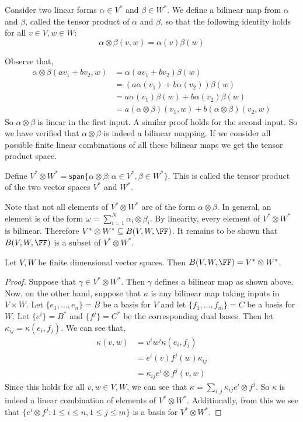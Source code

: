 \begin{defn}
Consider two linear forms $\alpha \in V^*$ and $\beta \in W^*$. We define a bilinear map from $\alpha$ and $\beta$, called the tensor product of $\alpha$ and $\beta$, so that the following identity holds for all $v\in V, w\in W$:
\[\alpha\otimes \beta (v,w) = \alpha(v)\beta(w)\]
\end{defn}
Observe that,
\begin{align*}\alpha\otimes\beta(av_1+bv_2,w) &= \alpha(av_1+bv_2)\beta(w) \\&= (a\alpha(v_1)+b\alpha(v_2))\beta(w)\\& = a\alpha(v_1)\beta(w)+b\alpha(v_2)\beta(w)\\& = a(\alpha\otimes \beta)(v_1,w) + b(\alpha\otimes\beta)(v_2,w)\end{align*}
So $\alpha\otimes \beta$ is linear in the first input. A similar proof holds for the second input. So we have verified that $\alpha\otimes\beta$ is indeed a bilinear mapping.
If we consider all possible finite linear combinations of all these bilinear maps we get the tensor product space.
\begin{defn}
    Define $V^* \otimes W^* = \textsf{span}\{\alpha\otimes \beta: \alpha\in V^*, \beta\in W^*\}$. This is called the tensor product of the two vector spaces $V^*$ and $W^*$.
\end{defn}
Note that not all elements of $V^*\otimes W^*$ are of the form $\alpha \otimes \beta$. In general, an element is of the form $\omega = \sum_{i=1}^N \alpha_i \otimes \beta_i$.
By linearity, every element of $V^*\otimes W^*$ is bilinear.
Therefore $V^*\otimes W^* \subseteq B(V, W, \FF)$.
It remains to be shown that $B(V, W, \FF)$ is a subset of $V^* \otimes W^*$.
\begin{thm}
    Let $V,W$ be finite dimensional vector spaces. Then $B(V,W,\FF) = V^*\otimes W^*$.
\end{thm}
\begin{proof}Suppose that $\gamma \in V^* \otimes W^*$. Then $\gamma$ defines a bilinear map as shown above. Now, on the other hand, suppose that $\kappa$ is any bilinear map taking inputs in $V\times W$. Let $\{e_1,...,e_n\}=B$ be a basis for $V$ and let $\{f_1,...,f_m\}=C$ be a basis for $W$. Let $\{e^i\}=B^*$ and $\{f^j\}=C^*$ be the corresponding dual bases. Then let $\kappa_{ij} = \kappa(e_i,f_j)$. We can see that,
\begin{align*}
    \kappa(v,w) &= v^i w^j \kappa(e_i,f_j) \\
    &= e^i(v)f^j(w)\kappa_{ij}\\
    &= \kappa_{ij} e^i\otimes f^j(v,w)
\end{align*}
Since this holds for all $v,w\in V,W$, we can see that $\kappa = \sum_{i,j} \kappa_{ij} e^i\otimes f^j$. So $\kappa$ is indeed a linear combination of elements of $V^*\otimes W^*$. Additionally, from this we see that $\{e^i\otimes f^j : 1\leq i\leq n, 1\leq j \leq m\}$ is a basis for $V^* \otimes W^*$.\end{proof}
